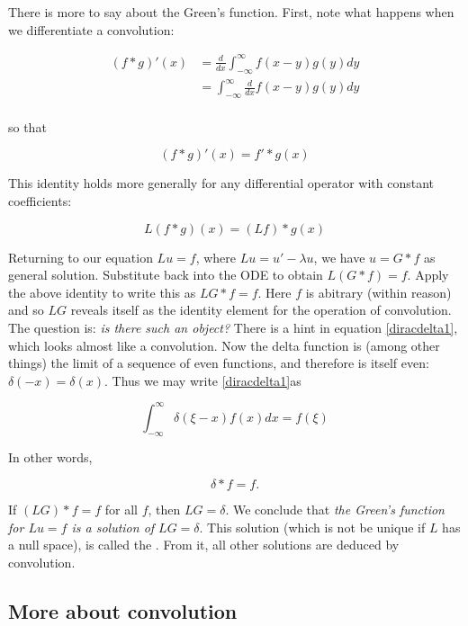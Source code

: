 There is more to say about the Green's function.  First, note what happens when we differentiate a convolution:

\begin{align}
(f*g)'(x) &= \frac{d}{dx} \int_{-\infty}^{\infty} f(x-y)g(y)dy \\
&= \int_{-\infty}^{\infty} \frac{d}{dx}  f(x-y)g(y)dy \\
\end{align}

so that 

\begin{equation}
(f*g)'(x)= f'*g(x)
\end{equation}

This identity holds more generally for any differential operator with constant coefficients:

\begin{equation}
L(f*g)(x)= (Lf)*g(x)
\end{equation}

Returning to our equation $Lu = f$, where $Lu  = u' -\lambda u$, we have $u = G*f$ as general solution.  Substitute back into the ODE to obtain $L(G*f) = f$.  
Apply the above identity to write this as $LG*f = f$.
Here $f$ is abitrary (within reason) and so $LG$ reveals itself as the identity element for the operation of convolution.  The question is: \emph{is there such an object?}
There is  a hint in equation  \eqref{diracdelta1}, which looks almost like a convolution.  Now the delta function is (among other things) the limit of a sequence of even functions, and therefore is itself even: $\delta(-x) = \delta(x)$.  Thus we may write \eqref{diracdelta1}as

\begin{equation}
\label{diracdelta2}
 \int_{-\infty}^\infty \delta(\xi-x)f(x)dx =  f(\xi)
\end{equation}

In other words,

\begin{equation}
 \delta*f = f.
\end{equation}

If $(LG)* f = f$ for all $f$, then $LG = \delta$.  We conclude that \emph{the Green's function for $Lu = f$ is a solution of $LG = \delta$}.  This solution (which is not be unique if $L$ has a null space), is called the .  From it, all other solutions are deduced by convolution.


\subsection{More about convolution}

